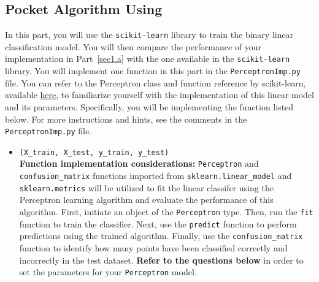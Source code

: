 \documentclass{article}
\theoremstyle{definition}
\begin{document}
\subsection{Pocket Algorithm Using } \label{part1.2}
In this part, you will use the \verb|scikit-learn| library to train the binary linear classification model. You will
then compare the performance of your implementation in Part~\ref{sec1.a} with the one available in the \verb|scikit-learn|
library. You will implement one function in this part in the \verb|PerceptronImp.py| file. You can refer to the Perceptron class and function reference by scikit-learn, available  \href{https://scikit-learn.org/stable/modules/generated/sklearn.linear_model.Perceptron.html}{here}, to familiarize yourself with the implementation of this linear model and its parameters. Specifically, you will be implementing the function listed below. For more instructions and hints, see the comments in the \verb|PerceptronImp.py|
file.
\begin{itemize}
	\item{\verb|(X_train, X_test, y_train, y_test)|\\\textbf{Function implementation considerations:}
		\verb|Perceptron| and \verb|confusion_matrix| functions imported from \verb|sklearn.linear_model| and
		\verb|sklearn.metrics| will be utilized to fit the linear classifer using the Perceptron learning
		algorithm and evaluate the performance of this algorithm. First, initiate an object of the \verb|Perceptron| type. Then, run the \verb|fit|
		function to train the classifier. Next, use the \verb|predict| function to perform predictions using
		the trained algorithm. Finally, use the \verb|confusion_matrix| function to identify how
		many points have been classified correctly and incorrectly in the test dataset. \textbf{Refer to the
		 questions below} in order to set the parameters for your \verb|Perceptron| model.} 
\end{itemize}
\end{document}
